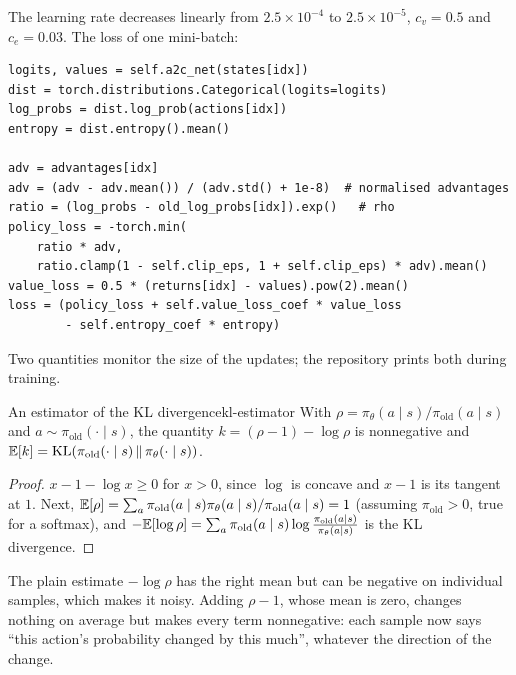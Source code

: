 The learning rate decreases linearly from $2.5 \times 10^{-4}$ to $2.5
\times 10^{-5}$, $c_v = 0.5$ and $c_e = 0.03$. The loss of one mini-batch:
\begin{lstlisting}[caption={PPO loss of a mini-batch (\code{algorithms.py},
  \code{A2C.update}, excerpt)}]
logits, values = self.a2c_net(states[idx])
dist = torch.distributions.Categorical(logits=logits)
log_probs = dist.log_prob(actions[idx])
entropy = dist.entropy().mean()

adv = advantages[idx]
adv = (adv - adv.mean()) / (adv.std() + 1e-8)  # normalised advantages
ratio = (log_probs - old_log_probs[idx]).exp()   # rho
policy_loss = -torch.min(
    ratio * adv,
    ratio.clamp(1 - self.clip_eps, 1 + self.clip_eps) * adv).mean()
value_loss = 0.5 * (returns[idx] - values).pow(2).mean()
loss = (policy_loss + self.value_loss_coef * value_loss
        - self.entropy_coef * entropy)
\end{lstlisting} Two quantities monitor the
size of the updates; the repository prints both during training.

\begin{proposition}{An estimator of the KL divergence}{kl-estimator}
  With $\rho = \pi_\theta(a \mid s) / \pi_{\mathrm{old}}(a \mid s)$ and $a
  \sim \pi_{\mathrm{old}}(\cdot \mid s)$, the quantity $k = (\rho - 1) -
  \log \rho$ is nonnegative and $\mathbb{E}[k] = \mathrm{KL}(\pi_{\mathrm{old}}
  (\cdot \mid s) \,\|\, \pi_\theta(\cdot \mid s))$.
\end{proposition}

\begin{proof}
  $x - 1 - \log x \geq 0$ for $x > 0$, since $\log$ is concave and $x - 1$
  is its tangent at $1$. Next, $\mathbb{E}[\rho] = \sum_a \pi_{\mathrm{old}}(a \mid
  s) \pi_\theta(a \mid s) / \pi_{\mathrm{old}}(a \mid s) = 1$ (assuming
  $\pi_{\mathrm{old}} > 0$, true for a softmax), and $-\mathbb{E}[\log \rho] =
  \sum_a \pi_{\mathrm{old}}(a \mid s) \log \frac{\pi_{\mathrm{old}}(a \mid
  s)}{\pi_\theta(a \mid s)}$ is the KL divergence.
\end{proof}

\begin{intuition}
  The plain estimate $-\log \rho$ has the right mean but can be negative on
  individual samples, which makes it noisy. Adding $\rho - 1$, whose mean
  is zero, changes nothing on average but makes every term nonnegative:
  each sample now says ``this action's probability changed by this much'',
  whatever the direction of the change.
\end{intuition}

